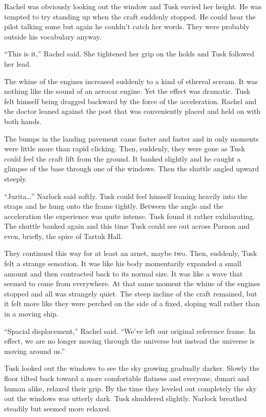 Rachel was obviously looking out the window and Tusk envied her height. He was tempted to try
standing up when the craft suddenly stopped. He could hear the pilot talking some but again he
couldn't catch her words. They were probably outside his vocabulary anyway.

``This is it,'' Rachel said. She tightened her grip on the holds and Tusk followed her lead.

The whine of the engines increased suddenly to a kind of ethereal scream. It was nothing like
the sound of an aerocar engine. Yet the effect was dramatic. Tusk felt himself being dragged
backward by the force of the acceleration. Rachel and the doctor leaned against the post that
was conveniently placed and held on with both hands.

The bumps in the landing pavement came faster and faster and in only moments were little more
than rapid clicking. Then, suddenly, they were gone as Tusk could feel the craft lift from the
ground. It banked slightly and he caught a glimpse of the base through one of the windows. Then
the shuttle angled upward steeply.

``Jurita\ldots'' Narlock said softly. Tusk could feel himself leaning heavily into the straps
and he hung onto the frame tightly. Between the angle and the acceleration the experience was
quite intense. Tusk found it rather exhilarating. The shuttle banked again and this time Tusk
could see out across Parnon and even, briefly, the spire of Tartuk Hall.

They continued this way for at least an arnet, maybe two. Then, suddenly, Tusk felt a strange
sensation. It was like his body momentarily expanded a small amount and then contracted back to
its normal size. It was like a wave that seemed to come from everywhere. At that same moment the
whine of the engines stopped and all was strangely quiet. The steep incline of the craft
remained, but it felt more like they were perched on the side of a fixed, sloping wall rather
than in a moving ship.

``Spacial displacement,'' Rachel said. ``We've left our original reference frame. In effect, we
are no longer moving through the universe but instead the universe is moving around us.''

Tusk looked out the windows to see the sky growing gradually darker. Slowly the floor tilted
back toward a more comfortable flatness and everyone, dunari and human alike, relaxed their
grip. By the time they leveled out completely the sky out the windows was utterly dark. Tusk
shuddered slightly. Narlock breathed steadily but seemed more relaxed.

